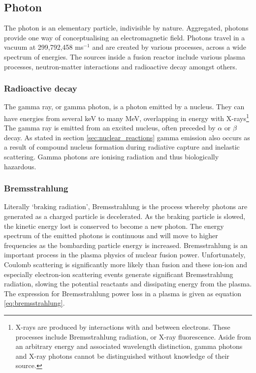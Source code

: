\subsection{Photon}
The photon is an elementary particle, indivisible by nature. Aggregated, photons provide one way of conceptualising an electromagnetic field. Photons travel in a vacuum at 299,792,458 ms$^{-1}$ and are created by various processes, across a wide spectrum of energies. The sources inside a fusion reactor include various plasma processes, neutron-matter interactions and radioactive decay amongst others. 

\subsubsection{Radioactive decay}
The gamma ray, or gamma photon, is a photon emitted by a nucleus. They can have energies from several keV to many MeV, overlapping in energy with X-rays\footnote{X-rays are produced by interactions with and between electrons. These processes include Bremsstrahlung radiation, or X-ray fluorescence. Aside from an arbitrary energy and associated wavelength distinction, gamma photons and X-ray photons cannot be distinguished without knowledge of their source.} The gamma ray is emitted from an excited nucleus, often preceded by $\alpha$ or $\beta$ decay. As stated in section \ref{sec:nuclear_reactions} gamma emission also occurs as a result of compound nucleus formation during radiative capture and inelastic scattering. Gamma photons are ionising radiation and thus biologically hazardous. 

\subsubsection{Bremsstrahlung}
Literally `braking radiation', Bremsstrahlung is the process whereby photons are generated as a charged particle is decelerated. As the braking particle is slowed, the kinetic energy lost is conserved to become a new photon. The energy spectrum of the emitted photons is continuous and will move to higher frequencies as the bombarding particle energy is increased. Bremsstrahlung is an important process in the plasma physics of nuclear fusion power. Unfortunately, Coulomb scattering is significantly more likely than fusion and these ion-ion and especially electron-ion scattering events generate significant Bremsstrahlung radiation, slowing the potential reactants and dissipating energy from the plasma. The expression for Bremsstrahlung power loss in a plasma is given as equation \ref{eq:bremsstrahlung}. 

